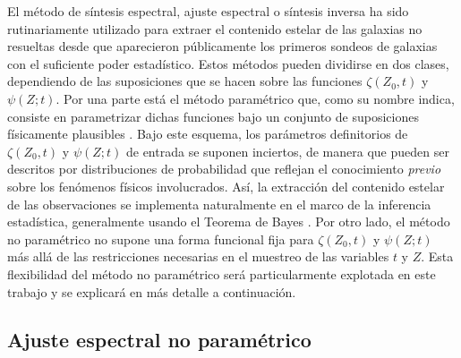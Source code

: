 El método de síntesis espectral, ajuste espectral o síntesis inversa ha sido rutinariamente
utilizado para extraer el contenido estelar de las galaxias no resueltas desde que aparecieron
públicamente los primeros sondeos de galaxias con el suficiente poder estadístico. Estos métodos
pueden dividirse en dos clases, dependiendo de las suposiciones que se hacen sobre las funciones
$\zeta(Z_0,t)$ y $\psi(Z;t)$. Por una parte está el método paramétrico que, como su nombre indica,
consiste en parametrizar dichas funciones bajo un conjunto de suposiciones físicamente plausibles
\citep[\eg,][]{Kauffmann2003, Brinchmann2004, Gallazzi2005, Kriek2009}. Bajo este esquema, los
parámetros definitorios de $\zeta(Z_0,t)$ y $\psi(Z;t)$ de entrada se suponen inciertos, de manera
que pueden ser descritos por distribuciones de probabilidad que reflejan el conocimiento
\emph{previo} sobre los fenómenos físicos involucrados. Así, la extracción del contenido estelar de
las observaciones se implementa naturalmente en el marco de la inferencia estadística, generalmente
usando el Teorema de Bayes \citep[véase apéndice en][]{Kauffmann2003}. Por otro lado, el método no
paramétrico no supone una forma funcional fija para $\zeta(Z_0,t)$ y $\psi(Z;t)$ más allá de las
restricciones necesarias en el muestreo de las variables $t$ y $Z$. Esta flexibilidad del método no
paramétrico será particularmente explotada en este trabajo y se explicará en más detalle a
continuación.

\subsection{Ajuste espectral no paramétrico}

